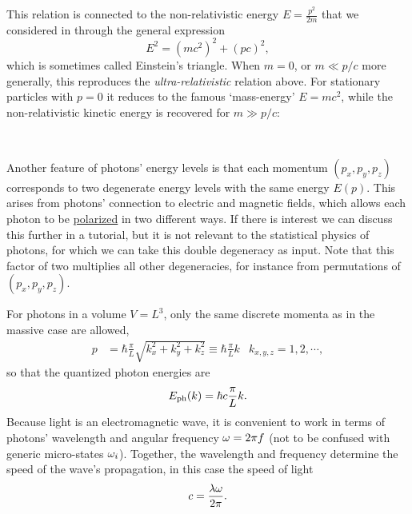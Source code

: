 This relation is connected to the non-relativistic energy $E = \frac{p^2}{2m}$ that we considered in  through the general expression
\begin{equation*}
  E^2 = \left(mc^2\right)^2 + \left(pc\right)^2,
\end{equation*}
which is sometimes called Einstein's triangle.
When $m = 0$, or $m \ll p / c$ more generally, this reproduces the \emph{ultra-relativistic} relation above.
For stationary particles with $p = 0$ it reduces to the famous `mass-energy' $E = mc^2$, while the non-relativistic kinetic energy is recovered for $m \gg p / c$: %
\begin{mdframed}
  \ \\[60 pt] %
\end{mdframed}

Another feature of photons' energy levels is that each momentum $(p_x, p_y, p_z)$ corresponds to two degenerate energy levels with the same energy $E(p)$.
This arises from photons' connection to electric and magnetic fields, which allows each photon to be \href{https://en.wikipedia.org/wiki/Photon_polarization}{polarized} in two different ways.
If there is interest we can discuss this further in a tutorial, but it is not relevant to the statistical physics of photons, for which we can take this double degeneracy as input.
Note that this factor of two multiplies all other degeneracies, for instance from permutations of $(p_x, p_y, p_z)$.

For photons in a volume $V = L^3$, only the same discrete momenta as in the massive case are allowed,
\begin{align*}
  p & = \hbar \frac{\pi}{L} \sqrt{k_x^2 + k_y^2 + k_z^2} \equiv \hbar \frac{\pi}{L} k &
  k_{x, y, z} = 1, 2, \cdots,
\end{align*}
so that the quantized photon energies are
\begin{equation}
  \label{eq:photon_Ek}
  E_{\text{ph}}(k) = \hbar c \frac{\pi}{L} k.
\end{equation}
Because light is an electromagnetic wave, it is convenient to work in terms of photons' wavelength \la and angular frequency $\omega = 2\pi f$ (not to be confused with generic micro-states $\omega_i$).
Together, the wavelength and frequency determine the speed of the wave's propagation, in this case the speed of light %
\begin{equation*}
  c = \frac{\lambda \omega}{2\pi}.
\end{equation*}

